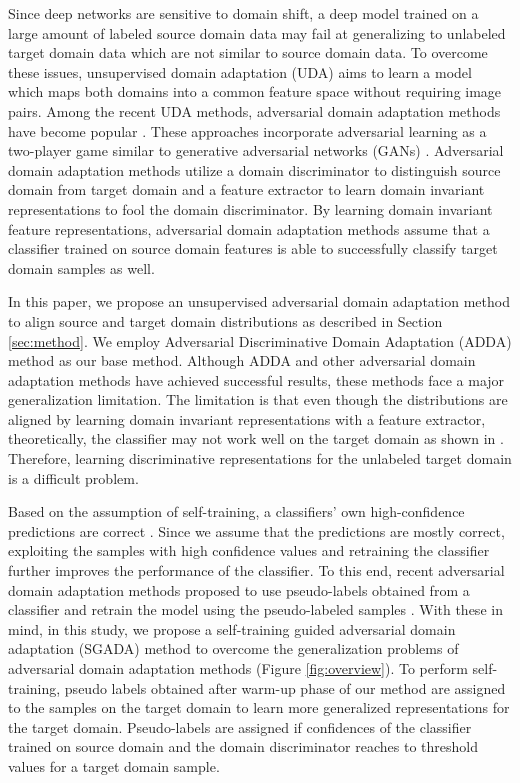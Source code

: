 \documentclass[final]{cvpr}
\begin{document}
Since deep networks are sensitive to domain shift, a deep model trained on a large amount of labeled source domain data may fail at generalizing to unlabeled target domain data which are not similar to source domain data. To overcome these issues, unsupervised domain adaptation (UDA) aims to learn a model which maps both domains into a common feature space without requiring image pairs. Among the recent UDA methods, adversarial domain adaptation methods have become popular \cite{dann, tat, cdan, adda}. These approaches incorporate adversarial learning as a two-player game similar to generative adversarial networks (GANs) \cite{gan}. Adversarial domain adaptation methods utilize a domain discriminator to distinguish source domain from target domain and a feature extractor to learn domain invariant representations to fool the domain discriminator. By learning domain invariant feature representations, adversarial domain adaptation methods assume that a classifier trained on source domain features is able to successfully classify target domain samples as well. 

In this paper, we propose an unsupervised adversarial domain adaptation method to align source and target domain distributions as described in Section \ref{sec:method}. We employ Adversarial Discriminative Domain Adaptation (ADDA) \cite{adda} method as our base method. Although ADDA and other adversarial domain adaptation methods have achieved successful results, these methods face a major generalization limitation. The limitation is that even though the distributions are aligned by learning domain invariant representations with a feature extractor, theoretically, the classifier may not work well on the target domain as shown in \cite{ben2010theory}. Therefore, learning discriminative representations for the unlabeled target domain is a difficult problem.

Based on the assumption of self-training, a classifiers' own high-confidence predictions are correct \cite{zhu2005semi}. Since we assume that the predictions are mostly correct, exploiting the samples with high confidence values and retraining the classifier further improves the performance of the classifier. To this end, recent adversarial domain adaptation methods proposed to use pseudo-labels obtained from a classifier and retrain the model using the pseudo-labeled samples \cite{saito2017asymmetric, xie2018learning, zhang2018collaborative}. With these in mind, in this study, we propose a self-training guided adversarial domain adaptation (SGADA) method to overcome the generalization problems of adversarial domain adaptation methods (Figure \ref{fig:overview}). To perform self-training, pseudo labels obtained after warm-up phase of our method are assigned to the samples on the target domain to learn more generalized representations for the target domain. Pseudo-labels are assigned if confidences of the classifier trained on source domain and the domain discriminator reaches to threshold values for a target domain sample.
\end{document}
